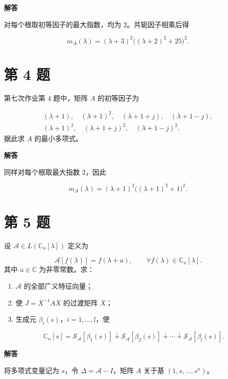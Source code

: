 \documentclass[UTF8,10pt,letterpaper,fontset=fandol]{ctexart}
\newcommand{\C}{\mathbb C}
\begin{document}
\par{}\textbf{解答}\par
对每个根取初等因子的最大指数，均为 $2$。共轭因子相乘后得

\[
\boxed{m_A(\lambda)=(\lambda+3)^2\bigl((\lambda+2)^2+25\bigr)^2}.
\]

\newpage

\section{第 4 题}
第七次作业第 4 题中，矩阵 $A$ 的初等因子为

\[
\begin{gathered}
(\lambda+1),\quad(\lambda+1)^2,\quad(\lambda+1+j),\quad(\lambda+1-j),\\
(\lambda+1)^2,\quad(\lambda+1+j)^2,\quad(\lambda+1-j)^2.
\end{gathered}
\]
据此求 $A$ 的最小多项式。

\par{}\textbf{解答}\par
同样对每个根取最大指数 $2$，因此

\[
\boxed{m_A(\lambda)=(\lambda+1)^2\bigl((\lambda+1)^2+1\bigr)^2}.
\]

\section{第 5 题}
设 $\mathcal A\in L(\C_n[\lambda])$ 定义为

\[
\mathcal A[f(\lambda)]=f(\lambda+a),\qquad\forall f(\lambda)\in\C_n[\lambda].
\]
其中 $a\in\C$ 为非零常数。求：

\begin{enumerate}
\item $\mathcal A$ 的全部广义特征向量；

\item 使 $J=X^{-1}AX$ 的过渡矩阵 $X$；

\item 生成元 $\beta_i(s)$，$i=1,\ldots,l$，使

\[
\C_n[s]=\mathcal S_{\mathcal A}[\beta_1(s)]\dotplus\mathcal S_{\mathcal A}[\beta_2(s)]\dotplus\cdots\dotplus\mathcal S_{\mathcal A}[\beta_l(s)].
\]

\end{enumerate}

\par{}\textbf{解答}\par
将多项式变量记为 $s$，令 $\Delta=\mathcal A-I$，矩阵 $A$ 关于基 $(1,s,\ldots,s^n)$。
\end{document}
